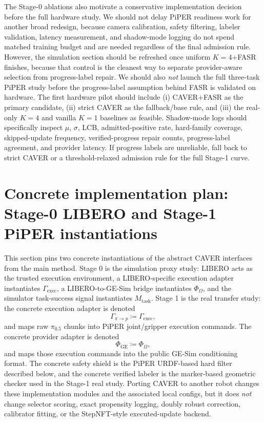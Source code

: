 \documentclass[10pt]{article}
\theoremstyle{plain}
\theoremstyle{definition}
\theoremstyle{remark}
\begin{document}
The Stage-0 ablations also motivate a conservative implementation decision before the full hardware study. We should not delay PiPER readiness work for another broad redesign, because camera calibration, safety filtering, labeler validation, latency measurement, and shadow-mode logging do not spend matched training budget and are needed regardless of the final admission rule. However, the simulation section should be refreshed once uniform $K=4$+FASR finishes, because that control is the cleanest way to separate provider-aware selection from progress-label repair. We should also \emph{not} launch the full three-task PiPER study before the progress-label assumption behind FASR is validated on hardware. The first hardware pilot should include (i) CAVER+FASR as the primary candidate, (ii) strict CAVER as the fallback/base rule, and (iii) the real-only $K=4$ and vanilla $K=1$ baselines as feasible. Shadow-mode logs should specifically inspect $\mu$, $\sigma$, LCB, admitted-positive rate, hard-family coverage, skipped-update frequency, verified-progress repair counts, progress-label agreement, and provider latency. If progress labels are unreliable, fall back to strict CAVER or a threshold-relaxed admission rule for the full Stage-1 curve.

\section{Concrete implementation plan: Stage-0 LIBERO and Stage-1 PiPER instantiations}
This section pins two concrete instantiations of the abstract CAVER interfaces from the main method. Stage 0 is the simulation proxy study: LIBERO acts as the trusted execution environment, a LIBERO-specific execution adapter instantiates $\Gamma_{\mathrm{exec}}$, a LIBERO-to-GE-Sim bridge instantiates $\Phi_{\Omega}$, and the simulator task-success signal instantiates $M_{\mathrm{task}}$. Stage 1 is the real transfer study: the concrete execution adapter is denoted
\[
\Gamma_{\pi\rightarrow p}\coloneqq \Gamma_{\mathrm{exec}},
\]
and maps raw $\pi_{0.5}$ chunks into PiPER joint/gripper execution commands. The concrete provider adapter is denoted
\[
\Phi_{\mathrm{GE}}\coloneqq \Phi_{\Omega},
\]
and maps those execution commands into the public GE-Sim conditioning format. The concrete safety shield is the PiPER URDF-based hard filter described below, and the concrete verified labeler is the marker-based geometric checker used in the Stage-1 real study. Porting CAVER to another robot changes these implementation modules and the associated local configs, but it does \emph{not} change selector scoring, exact propensity logging, doubly robust correction, calibrator fitting, or the StepNFT-style executed-update backend.
\end{document}
